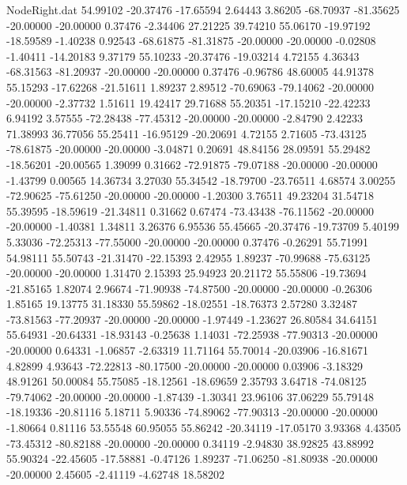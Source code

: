\begin{filecontents}{NodeRight.dat}
  54.99102  -20.37476  -17.65594     2.64443    3.86205  -68.70937  -81.35625  -20.00000  -20.00000    0.37476   -2.34406   27.21225   39.74210
  55.06170  -19.97192  -18.59589    -1.40238    0.92543  -68.61875  -81.31875  -20.00000  -20.00000   -0.02808   -1.40411  -14.20183    9.37179
  55.10233  -20.37476  -19.03214     4.72155    4.36343  -68.31563  -81.20937  -20.00000  -20.00000    0.37476   -0.96786   48.60005   44.91378
  55.15293  -17.62268  -21.51611     1.89237    2.89512  -70.69063  -79.14062  -20.00000  -20.00000   -2.37732    1.51611   19.42417   29.71688
  55.20351  -17.15210  -22.42233     6.94192    3.57555  -72.28438  -77.45312  -20.00000  -20.00000   -2.84790    2.42233   71.38993   36.77056
  55.25411  -16.95129  -20.20691     4.72155    2.71605  -73.43125  -78.61875  -20.00000  -20.00000   -3.04871    0.20691   48.84156   28.09591
  55.29482  -18.56201  -20.00565     1.39099    0.31662  -72.91875  -79.07188  -20.00000  -20.00000   -1.43799    0.00565   14.36734    3.27030
  55.34542  -18.79700  -23.76511     4.68574    3.00255  -72.90625  -75.61250  -20.00000  -20.00000   -1.20300    3.76511   49.23204   31.54718
  55.39595  -18.59619  -21.34811     0.31662    0.67474  -73.43438  -76.11562  -20.00000  -20.00000   -1.40381    1.34811    3.26376    6.95536
  55.45665  -20.37476  -19.73709     5.40199    5.33036  -72.25313  -77.55000  -20.00000  -20.00000    0.37476   -0.26291   55.71991   54.98111
  55.50743  -21.31470  -22.15393     2.42955    1.89237  -70.99688  -75.63125  -20.00000  -20.00000    1.31470    2.15393   25.94923   20.21172
  55.55806  -19.73694  -21.85165     1.82074    2.96674  -71.90938  -74.87500  -20.00000  -20.00000   -0.26306    1.85165   19.13775   31.18330
  55.59862  -18.02551  -18.76373     2.57280    3.32487  -73.81563  -77.20937  -20.00000  -20.00000   -1.97449   -1.23627   26.80584   34.64151
  55.64931  -20.64331  -18.93143    -0.25638    1.14031  -72.25938  -77.90313  -20.00000  -20.00000    0.64331   -1.06857   -2.63319   11.71164
  55.70014  -20.03906  -16.81671     4.82899    4.93643  -72.22813  -80.17500  -20.00000  -20.00000    0.03906   -3.18329   48.91261   50.00084
  55.75085  -18.12561  -18.69659     2.35793    3.64718  -74.08125  -79.74062  -20.00000  -20.00000   -1.87439   -1.30341   23.96106   37.06229
  55.79148  -18.19336  -20.81116     5.18711    5.90336  -74.89062  -77.90313  -20.00000  -20.00000   -1.80664    0.81116   53.55548   60.95055
  55.86242  -20.34119  -17.05170     3.93368    4.43505  -73.45312  -80.82188  -20.00000  -20.00000    0.34119   -2.94830   38.92825   43.88992
  55.90324  -22.45605  -17.58881    -0.47126    1.89237  -71.06250  -81.80938  -20.00000  -20.00000    2.45605   -2.41119   -4.62748   18.58202

\end{filecontents}
